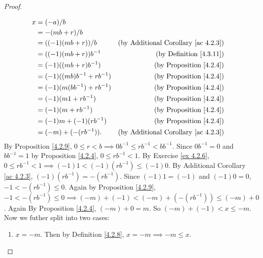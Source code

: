 \begin{proof}
\begin{enumerate}
\begin{align*}
                  x & = (-a) / b                                                                     \\
                    & = -(mb + r) / b                                                                \\
                    & = ((-1)(mb + r)) / b         & \text{(by Additional Corollary \ref{ac 4.2.3})} \\
                    & = ((-1)(mb + r))b^{-1}       & \text{(by Definition \ref{4.3.11})}             \\
                    & = (-1)((mb + r)b^{-1})       & \text{(by Proposition \ref{4.2.4})}             \\
                    & = (-1)((mb)b^{-1} + rb^{-1}) & \text{(by Proposition \ref{4.2.4})}             \\
                    & = (-1)(m(bb^{-1}) + rb^{-1}) & \text{(by Proposition \ref{4.2.4})}             \\
                    & = (-1)(m1 + rb^{-1})         & \text{(by Proposition \ref{4.2.4})}             \\
                    & = (-1)(m + rb^{-1})          & \text{(by Proposition \ref{4.2.4})}             \\
                    & = (-1)m + (-1)(rb^{-1})      & \text{(by Proposition \ref{4.2.4})}             \\
                    & = (-m) + (-(rb^{-1})).       & \text{(by Additional Corollary \ref{ac 4.2.3})} \\
              \end{align*}
              By Proposition \ref{4.2.9}, \(0 \leq r < b \implies 0b^{-1} \leq rb^{-1} < bb^{-1}\).
              Since \(0b^{-1} = 0\) and \(bb^{-1} = 1\) by Proposition \ref{4.2.4}, \(0 \leq rb^{-1} < 1\).
              By Exercise \ref{ex 4.2.6}, \(0 \leq rb^{-1} < 1 \implies (-1)1 < (-1)(rb^{-1}) \leq (-1)0\).
              By Additional Corollary \ref{ac 4.2.3}, \((-1)(rb^{-1}) = -(rb^{-1})\).
              Since \((-1)1 = (-1)\) and \((-1)0 = 0\), \(-1 < -(rb^{-1}) \leq 0\).
              Again by Proposition \ref{4.2.9}, \(-1 < -(rb^{-1}) \leq 0 \implies (-m) + (-1) < (-m) + (-(rb^{-1})) \leq (-m) + 0\).
              Again By Proposition \ref{4.2.4}, \((-m) + 0 = m\).
              So \((-m) + (-1) < x \leq -m\).
              Now we futher split into two cases:
              \begin{enumerate}[label=(\roman*)]
                  \item \(x = -m\).
                        Then by Definition \ref{4.2.8}, \(x = -m \implies -m \leq x\).

\end{enumerate}
\end{enumerate}
\end{proof}
